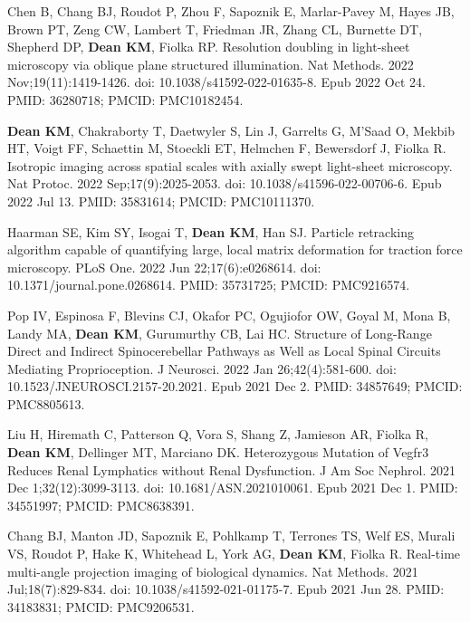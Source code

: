 \begin{etaremune}
\item Chen B, Chang BJ, Roudot P, Zhou F, Sapoznik E, Marlar-Pavey M, Hayes JB, Brown PT, Zeng CW, Lambert T, Friedman JR, Zhang CL, Burnette DT, Shepherd DP, \textbf{Dean KM}, Fiolka RP. Resolution doubling in light-sheet microscopy via oblique plane structured illumination. Nat Methods. 2022 Nov;19(11):1419-1426. doi: 10.1038/s41592-022-01635-8. Epub 2022 Oct 24. PMID: 36280718; PMCID: PMC10182454.

\item \textbf{Dean KM}, Chakraborty T, Daetwyler S, Lin J, Garrelts G, M'Saad O, Mekbib HT, Voigt FF, Schaettin M, Stoeckli ET, Helmchen F, Bewersdorf J, Fiolka R. Isotropic imaging across spatial scales with axially swept light-sheet microscopy. Nat Protoc. 2022 Sep;17(9):2025-2053. doi: 10.1038/s41596-022-00706-6. Epub 2022 Jul 13. PMID: 35831614; PMCID: PMC10111370.

\item Haarman SE, Kim SY, Isogai T, \textbf{Dean KM}, Han SJ. Particle retracking algorithm capable of quantifying large, local matrix deformation for traction force microscopy. PLoS One. 2022 Jun 22;17(6):e0268614. doi: 10.1371/journal.pone.0268614. PMID: 35731725; PMCID: PMC9216574.

\item Pop IV, Espinosa F, Blevins CJ, Okafor PC, Ogujiofor OW, Goyal M, Mona B, Landy MA, \textbf{Dean KM}, Gurumurthy CB, Lai HC. Structure of Long-Range Direct and Indirect Spinocerebellar Pathways as Well as Local Spinal Circuits Mediating Proprioception. J Neurosci. 2022 Jan 26;42(4):581-600. doi: 10.1523/JNEUROSCI.2157-20.2021. Epub 2021 Dec 2. PMID: 34857649; PMCID: PMC8805613.

\item Liu H, Hiremath C, Patterson Q, Vora S, Shang Z, Jamieson AR, Fiolka R, \textbf{Dean KM}, Dellinger MT, Marciano DK. Heterozygous Mutation of Vegfr3 Reduces Renal Lymphatics without Renal Dysfunction. J Am Soc Nephrol. 2021 Dec 1;32(12):3099-3113. doi: 10.1681/ASN.2021010061. Epub 2021 Dec 1. PMID: 34551997; PMCID: PMC8638391.

\item Chang BJ, Manton JD, Sapoznik E, Pohlkamp T, Terrones TS, Welf ES, Murali VS, Roudot P, Hake K, Whitehead L, York AG, \textbf{Dean KM}, Fiolka R. Real-time multi-angle projection imaging of biological dynamics. Nat Methods. 2021 Jul;18(7):829-834. doi: 10.1038/s41592-021-01175-7. Epub 2021 Jun 28. PMID: 34183831; PMCID: PMC9206531.


\end{etaremune}
